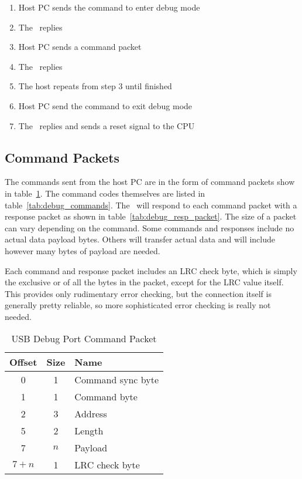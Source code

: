 \begin{enumerate}
    \item Host PC sends the command to enter debug mode
    \item The \jr\ replies
    \item Host PC sends a command packet
    \item The \jr\ replies
    \item The host repeats from step 3 until finished
    \item Host PC send the command to exit debug mode
    \item The \jr\ replies and sends a reset signal to the CPU
\end{enumerate}

\subsection*{Command Packets}

The commands sent from the host PC are in the form of command packets show in table~\ref{tab:debug_cmd_packet}. The command codes themselves are listed in table~\ref{tab:debug_commands}. The \jr\ will respond to each command packet with a response packet as shown in table~\ref{tab:debug_resp_packet}. The size of a packet can vary depending on the command. Some commands and responses include no actual data payload bytes. Others will transfer actual data and will include however many bytes of payload are needed.

Each command and response packet includes an LRC check byte, which is simply the exclusive or of all the bytes in the packet, except for the LRC value itself. This provides only rudimentary error checking, but the connection itself is generally pretty reliable, so more sophisticated error checking is really not needed.

\begin{table}[ht]
    \begin{center}
        \begin{tabular}{|c|c|l|} \hline
            Offset & Size & Name \\ \hline\hline
            0 & 1 & Command sync byte\\ \hline
            1 & 1 & Command byte \\ \hline
            2 & 3 & Address \\ \hline
            5 & 2 & Length \\ \hline
            7 & $n$ & Payload \\ \hline
            $7 + n$ & 1 & LRC check byte\\ \hline
        \end{tabular}
    \end{center}
    \caption{USB Debug Port Command Packet}
    \label{tab:debug_cmd_packet}
\end{table}

